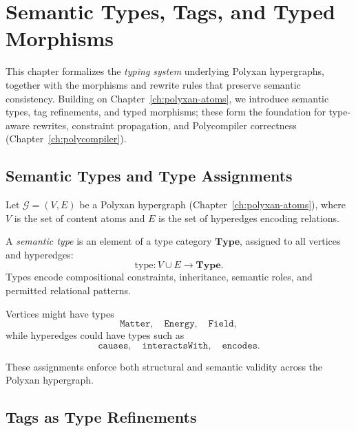 \chapter{Semantic Types, Tags, and Typed Morphisms}
\label{ch:semantic-types}

This chapter formalizes the \emph{typing system} underlying Polyxan hypergraphs, together with the morphisms and rewrite rules that preserve semantic consistency. Building on Chapter~\ref{ch:polyxan-atoms}, we introduce semantic types, tag refinements, and typed morphisms; these form the foundation for type-aware rewrites, constraint propagation, and Polycompiler correctness (Chapter~\ref{ch:polycompiler}).

\section{Semantic Types and Type Assignments}

Let $\mathcal{G} = (V,E)$ be a Polyxan hypergraph (Chapter~\ref{ch:polyxan-atoms}), where $V$ is the set of content atoms and $E$ is the set of hyperedges encoding relations.

\begin{definition}
A \emph{semantic type} is an element of a type category $\mathbf{Type}$, assigned to all vertices and hyperedges:
\[
\mathrm{type} : V \cup E \to \mathbf{Type}.
\]
Types encode compositional constraints, inheritance, semantic roles, and permitted relational patterns.
\end{definition}

\begin{example}
Vertices might have types
\[
\texttt{Matter},\quad \texttt{Energy},\quad \texttt{Field},
\]
while hyperedges could have types such as
\[
\texttt{causes},\quad \texttt{interactsWith},\quad \texttt{encodes}.
\]
\end{example}

These assignments enforce both structural and semantic validity across the Polyxan hypergraph.

\section{Tags as Type Refinements}

